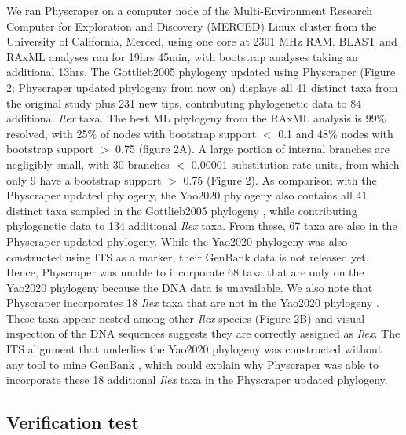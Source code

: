 \documentclass{bmcart}
\begin{document}
We ran Physcraper on a computer node of the Multi-Environment Research Computer for
Exploration and Discovery (MERCED) Linux cluster from the University of California,
Merced, using one core at 2301 MHz RAM. BLAST and RAxML analyses ran for 19hrs 45min, with bootstrap
analyses taking an additional 13hrs.
The Gottlieb2005 phylogeny \cite{gottlieb2005molecular} updated using Physcraper (Figure 2;
Physcraper updated phylogeny from now on) displays all 41 distinct
taxa from the original study plus 231 new tips, contributing phylogenetic data to
84 additional \textit{Ilex} taxa. The best ML phylogeny from the RAxML analysis is 99\%
resolved, with 25\% of nodes with bootstrap support $<$ 0.1 and 48\% nodes with
bootstrap support $>$ 0.75 (figure 2A).
A large portion of internal branches are negligibly small, with 30 branches
$<$ 0.00001 substitution rate units, from which only 9 have a bootstrap support $>$ 0.75
(Figure 2).
As comparison with the Physcraper updated phylogeny, the Yao2020 phylogeny \cite{yao2020phylogeny}
also contains all 41 distinct taxa
sampled in the Gottlieb2005 phylogeny \cite{gottlieb2005molecular},
while contributing phylogenetic data to 134 additional \textit{Ilex} taxa. From these,
67 taxa are also in the Physcraper updated phylogeny.
While the Yao2020 phylogeny \cite{yao2020phylogeny} was also constructed using
ITS as a marker, their GenBank data is not released yet. Hence, Physcraper was unable
to incorporate 68 taxa that are only on the Yao2020 phylogeny because the DNA data is unavailable.
We also note that Physcraper incorporates 18 \textit{Ilex} taxa that are not in the Yao2020
phylogeny \cite{yao2020phylogeny}. These taxa appear nested among other \textit{Ilex}
species (Figure 2B) and visual inspection of the DNA sequences suggests they are
correctly assigned as \textit{Ilex}.
The ITS alignment that underlies the Yao2020 phylogeny was constructed without any tool to
mine GenBank \cite{yao2020phylogeny}, which could explain why Physcraper was able to
incorporate these 18 additional \textit{Ilex} taxa in the Physcraper updated phylogeny.


\subsection*{Verification test}
\end{document}
